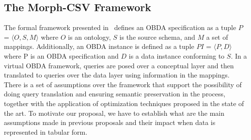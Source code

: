 \subsection{The Morph-CSV Framework}

The formal framework presented in~\citep{xiao2018obdasurvey} defines an OBDA specification as a tuple $P$ = $\langle O,S,M\rangle$ where $O$ is an ontology, $S$ is the source schema, and $M$ a set of mappings. Additionally, an OBDA instance is defined as a tuple $PI$ = $\langle P,D\rangle$ where P is an OBDA specification and $D$ is a data instance conforming to $S$. In a virtual OBDA framework, queries are posed over a conceptual layer and then translated to queries over the data layer using information in the mappings. There is a set of assumptions over the framework that support the possibility of doing query translation and  ensuring  semantic preservation in the process, together with the application of  optimization techniques proposed in the state of the art. To motivate our proposal, we have to establish what are the main assumptions made in previous proposals and their impact when data is represented in tabular form.


